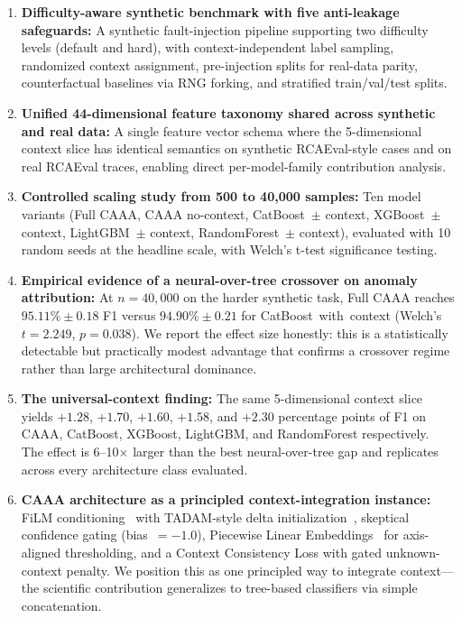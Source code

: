 \documentclass[12pt,a4paper]{report}
\newcommand{\sys}{CAAA}
\begin{document}
\begin{enumerate}
    \item \textbf{Difficulty-aware synthetic benchmark with five anti-leakage safeguards:} A synthetic fault-injection pipeline supporting two difficulty levels (default and hard), with context-independent label sampling, randomized context assignment, pre-injection splits for real-data parity, counterfactual baselines via RNG forking, and stratified train/val/test splits.

    \item \textbf{Unified 44-dimensional feature taxonomy shared across synthetic and real data:} A single feature vector schema where the 5-dimensional context slice has identical semantics on synthetic RCAEval-style cases and on real RCAEval traces, enabling direct per-model-family contribution analysis.

    \item \textbf{Controlled scaling study from 500 to 40{,}000 samples:} Ten model variants (Full \sys{}, \sys{} no-context, CatBoost~$\pm$ context, XGBoost~$\pm$ context, LightGBM~$\pm$ context, RandomForest~$\pm$ context), evaluated with 10 random seeds at the headline scale, with Welch's t-test significance testing.

    \item \textbf{Empirical evidence of a neural-over-tree crossover on anomaly attribution:} At $n = 40{,}000$ on the harder synthetic task, Full \sys{} reaches $95.11\% \pm 0.18$ F1 versus $94.90\% \pm 0.21$ for CatBoost~with~context (Welch's $t = 2.249$, $p = 0.038$). We report the effect size honestly: this is a statistically detectable but practically modest advantage that confirms a crossover regime rather than large architectural dominance.

    \item \textbf{The universal-context finding:} The same 5-dimensional context slice yields $+1.28$, $+1.70$, $+1.60$, $+1.58$, and $+2.30$ percentage points of F1 on CAAA, CatBoost, XGBoost, LightGBM, and RandomForest respectively. The effect is 6--10$\times$ larger than the best neural-over-tree gap and replicates across every architecture class evaluated.

    \item \textbf{\sys{} architecture as a principled context-integration instance:} FiLM conditioning~\cite{perez2018film} with TADAM-style delta initialization~\cite{oreshkin2018tadam}, skeptical confidence gating (bias~$=-1.0$), Piecewise Linear Embeddings~\cite{gorishniy2022embeddings} for axis-aligned thresholding, and a Context Consistency Loss with gated unknown-context penalty. We position this as one principled way to integrate context---the scientific contribution generalizes to tree-based classifiers via simple concatenation.
\end{enumerate}
\end{document}
